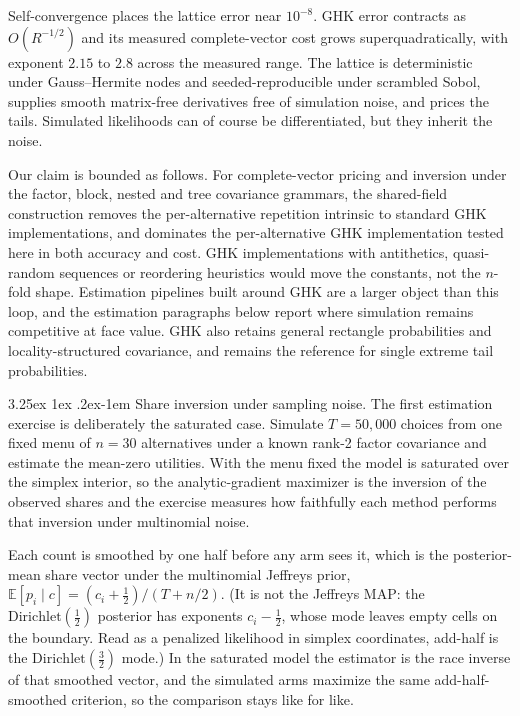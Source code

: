 \documentclass[11pt]{article}
\makeatletter
\renewcommand\paragraph{\@startsection{paragraph}{4}{\z@}%
  {3.25ex \@plus1ex \@minus.2ex}{-1em}%
  {\normalfont\normalsize\itshape}}
\makeatother
\begin{document}
Self-convergence places the lattice error near $10^{-8}$. GHK error
contracts as $O(R^{-1/2})$ and its measured complete-vector cost grows
superquadratically, with exponent $2.15$ to $2.8$ across the measured
range. The lattice is deterministic under Gauss--Hermite nodes and
seeded-reproducible under scrambled Sobol, supplies smooth matrix-free
derivatives free of simulation noise, and prices the tails. Simulated
likelihoods can of course be differentiated, but they inherit the noise.

Our claim is bounded as follows. For complete-vector pricing and
inversion under the factor, block, nested and tree covariance grammars,
the shared-field construction removes the per-alternative repetition
intrinsic to standard GHK implementations, and dominates the
per-alternative GHK implementation tested here in both accuracy and cost.
GHK implementations with antithetics, quasi-random sequences or
reordering heuristics would move the constants, not the $n$-fold shape.
Estimation pipelines built around GHK are a larger object than this loop,
and the estimation paragraphs below report where simulation remains
competitive at face value. GHK also retains general rectangle
probabilities and locality-structured covariance, and \citet{botev2017}
remains the reference for single extreme tail probabilities.

\paragraph{Share inversion under sampling noise.} The first estimation
exercise is deliberately the saturated case. Simulate $T=50{,}000$ choices
from one fixed menu of $n=30$ alternatives under a known rank-2 factor
covariance and estimate the mean-zero utilities. With
the menu fixed the model is saturated over the simplex interior, so the
analytic-gradient maximizer is the inversion of the observed shares and the
exercise measures how faithfully each method performs that inversion
under multinomial noise.

Each count is smoothed by one half before any arm sees it, which is the
posterior-mean share vector under the multinomial Jeffreys prior,
$\mathbb{E}[p_i\mid c]=(c_i+\tfrac12)/(T+n/2)$. (It is not the Jeffreys
MAP: the $\mathrm{Dirichlet}(\tfrac12)$ posterior has exponents
$c_i-\tfrac12$, whose mode leaves empty cells on the boundary. Read as a
penalized likelihood in simplex coordinates, add-half is the
$\mathrm{Dirichlet}(\tfrac32)$ mode.) In the saturated model the estimator
is the race inverse of that smoothed vector, and the simulated arms
maximize the same add-half-smoothed criterion, so the comparison stays
like for like.
\end{document}
